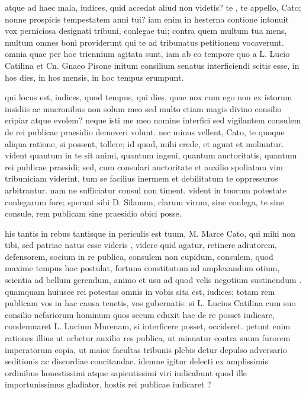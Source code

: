 atque ad haec mala, iudices, quid accedat aliud non videtis? te , te appello, Cato; nonne prospicis tempestatem anni tui? iam enim in hesterna contione intonuit vox perniciosa designati tribuni, conlegae tui; contra quem multum tua mens, multum omnes boni providerunt qui te ad tribunatus petitionem vocaverunt. omnia quae per hoc triennium agitata sunt, iam ab eo tempore quo a L. Lucio Catilina et Cn. Gnaeo Pisone initum consilium senatus interficiendi scitis esse, in hos dies, in hos mensis, in hoc tempus erumpunt.

 qui locus est, iudices, quod tempus, qui dies, quae nox cum ego non ex istorum insidiis ac mucronibus non solum meo sed multo etiam magis divino consilio eripiar atque evolem? neque isti me meo nomine interfici sed vigilantem consulem de rei publicae praesidio demoveri volunt. nec minus vellent, Cato, te quoque aliqua ratione, si possent, tollere; id quod, mihi crede, et agunt et moliuntur. vident quantum in te sit animi, quantum ingeni, quantum auctoritatis, quantum rei publicae praesidi; sed, cum consulari auctoritate et auxilio spoliatam vim tribuniciam viderint, tum se facilius inermem et debilitatum te oppressuros arbitrantur. nam ne sufficiatur consul non timent. vident in tuorum potestate conlegarum fore; sperant sibi D. Silanum, clarum virum, sine conlega, te sine consule, rem publicam sine praesidio obici posse.

 his tantis in rebus tantisque in periculis est tuum, M. Marce Cato, qui mihi non tibi, sed patriae natus esse videris , videre quid agatur, retinere adiutorem, defensorem, socium in re publica, consulem non cupidum, consulem, quod maxime tempus hoc postulat, fortuna constitutum ad amplexandum otium, scientia ad bellum gerendum, animo et usu ad quod velis negotium sustinendum . quamquam huiusce rei potestas omnis in vobis sita est, iudices; totam rem publicam vos in hac causa tenetis, vos gubernatis. si L. Lucius Catilina cum suo consilio nefariorum hominum quos secum eduxit hac de re posset iudicare, condemnaret L. Lucium Murenam, si interficere posset, occideret. petunt enim rationes illius ut orbetur auxilio res publica, ut minuatur contra suum furorem imperatorum copia, ut maior facultas tribunis plebis detur depulso adversario seditionis ac discordiae concitandae. idemne igitur delecti ex amplissimis ordinibus honestissimi atque sapientissimi viri iudicabunt quod ille importunissimus gladiator, hostis rei publicae iudicaret ?

